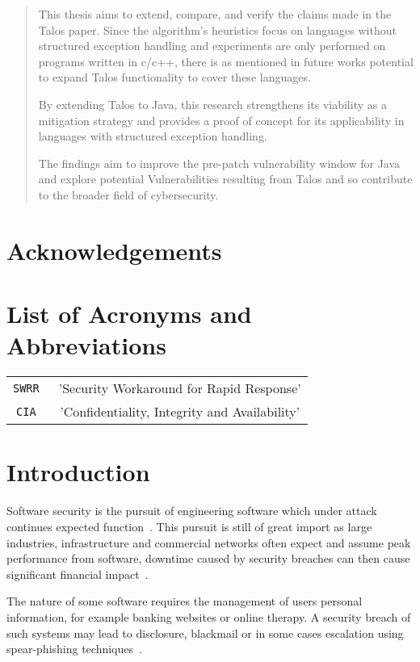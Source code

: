 \documentclass[a4paper,11pt]{report}
\begin{document}
\begin{abstract}
This thesis aims to extend, compare, and verify the claims made in the Talos paper. Since the algorithm's heuristics focus on languages without structured exception handling and experiments are only performed on programs written in c/c++, there is as mentioned in future works potential to expand Talos functionality to cover these languages.

By extending Talos to Java, this research strengthens its viability as a mitigation strategy and provides a proof of concept for its applicability in languages with structured exception handling.

The findings aim to improve the pre-patch vulnerability window for Java and explore potential Vulnerabilities resulting from Talos and so contribute to the broader field of cybersecurity. 


\end{abstract}
\cleardoublepage\chapter*{Acknowledgements}
\chapter*{List of Acronyms and Abbreviations}
\begin{center}
    \begin{tabular}{c | c}
        \verb|SWRR| &~'Security Workaround for Rapid Response' \\
        \verb|CIA| &~'Confidentiality, Integrity and Availability'\\
    \end{tabular}
\end{center}
\cleardoublepage\tableofcontents
\cleardoublepage\pagestyle{fancy}
\setcounter{page}{1}

\chapter{Introduction}
Software security is the pursuit of engineering software which under attack continues expected function~\cite{1281254}. This pursuit is still of great import as large industries, infrastructure and commercial networks often expect and assume peak performance from software, downtime caused by security breaches can then cause significant financial impact~\cite{cybersecurityreviewWHATCANT}.

The nature of some software requires the management of users personal information, for example banking websites or online therapy. A security breach of such systems may lead to disclosure, blackmail  or in some cases escalation using spear-phishing techniques~\cite{XU2023103908,doi:10.10520/EJC-1b9220e55b}.
\end{document}
